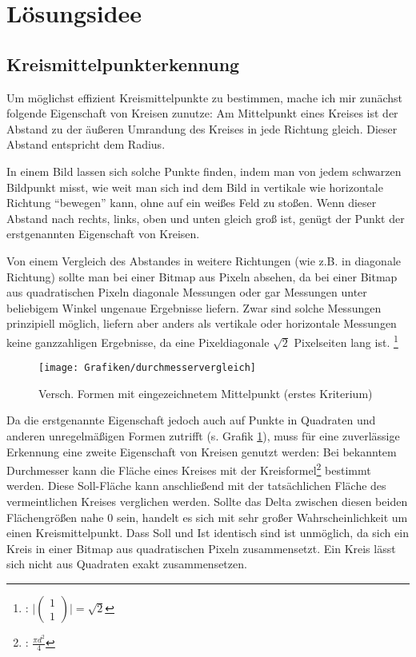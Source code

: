 \section{Lösungsidee}
\subsection{Kreismittelpunkterkennung}
Um möglichst effizient Kreismittelpunkte zu bestimmen, mache ich mir zunächst folgende Eigenschaft von Kreisen zunutze: Am Mittelpunkt eines Kreises ist der Abstand zu der äußeren Umrandung des Kreises in jede Richtung gleich. Dieser Abstand entspricht dem Radius.

In einem Bild lassen sich solche Punkte finden, indem man von jedem schwarzen Bildpunkt misst, wie weit man sich ind dem Bild in vertikale wie horizontale Richtung "`bewegen"' kann, ohne auf ein weißes Feld zu stoßen. Wenn dieser Abstand nach rechts, links, oben und unten gleich groß ist, genügt der Punkt der erstgenannten Eigenschaft von Kreisen. 

Von einem Vergleich des Abstandes in weitere Richtungen (wie z.B. in diagonale Richtung) sollte man bei einer Bitmap aus Pixeln absehen, da bei einer Bitmap aus quadratischen Pixeln diagonale Messungen oder gar Messungen unter beliebigem Winkel ungenaue Ergebnisse liefern. 
Zwar sind solche Messungen prinzipiell möglich, liefern aber anders als vertikale oder horizontale Messungen keine ganzzahligen Ergebnisse, da eine Pixeldiagonale \(\sqrt{2}\) Pixelseiten lang ist.
\footnote{: \( \vert \begin{pmatrix}1\\1\end{pmatrix} \vert = \sqrt{2}\)}

\begin{figure}[!ht]
	\centering	
	\texttt{[image: Grafiken/durchmesservergleich]}
	\caption{Versch. Formen mit eingezeichnetem Mittelpunkt (erstes Kriterium)}
	\label{abb:mischformen}
\end{figure}

Da die erstgenannte Eigenschaft jedoch auch auf Punkte in Quadraten und anderen unregelmäßigen Formen zutrifft (s. Grafik \ref{abb:mischformen}), muss für eine zuverlässige Erkennung eine zweite Eigenschaft von Kreisen genutzt werden: Bei bekanntem Durchmesser kann die Fläche eines Kreises mit der Kreisformel\footnote{: \(\frac{\pi d^2}{4}\)} bestimmt werden.
Diese Soll-Fläche kann anschließend mit der tatsächlichen Fläche des vermeintlichen Kreises verglichen werden. Sollte das Delta zwischen diesen beiden Flächengrößen nahe 0 sein, handelt es sich mit sehr großer Wahrscheinlichkeit um einen Kreismittelpunkt. 
Dass Soll und Ist identisch sind ist unmöglich, da sich ein Kreis in einer Bitmap aus quadratischen Pixeln zusammensetzt. Ein Kreis lässt sich nicht aus Quadraten exakt zusammensetzen.

